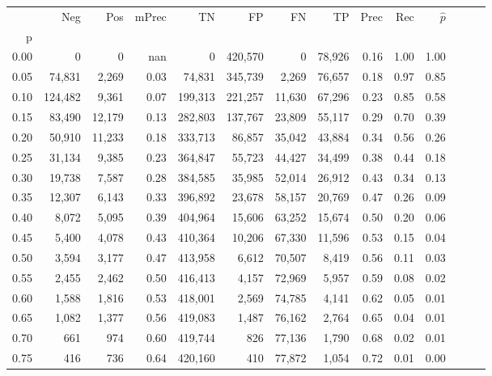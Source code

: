 \begin{tabular}{rrrrrrrrrrrrrr}
\toprule
{} &      Neg &     Pos & mPrec &       TN &       FP &      FN &      TP &  Prec &   Rec & $\hat{p}$ \\
p    &          &         &       &          &          &         &         &       &       &           \\
\midrule
0.00 &        0 &       0 &   nan &        0 &  420,570 &       0 &  78,926 &  0.16 &  1.00 &      1.00 \\
0.05 &   74,831 &   2,269 &  0.03 &   74,831 &  345,739 &   2,269 &  76,657 &  0.18 &  0.97 &      0.85 \\
0.10 &  124,482 &   9,361 &  0.07 &  199,313 &  221,257 &  11,630 &  67,296 &  0.23 &  0.85 &      0.58 \\
0.15 &   83,490 &  12,179 &  0.13 &  282,803 &  137,767 &  23,809 &  55,117 &  0.29 &  0.70 &      0.39 \\
0.20 &   50,910 &  11,233 &  0.18 &  333,713 &   86,857 &  35,042 &  43,884 &  0.34 &  0.56 &      0.26 \\
0.25 &   31,134 &   9,385 &  0.23 &  364,847 &   55,723 &  44,427 &  34,499 &  0.38 &  0.44 &      0.18 \\
0.30 &   19,738 &   7,587 &  0.28 &  384,585 &   35,985 &  52,014 &  26,912 &  0.43 &  0.34 &      0.13 \\
0.35 &   12,307 &   6,143 &  0.33 &  396,892 &   23,678 &  58,157 &  20,769 &  0.47 &  0.26 &      0.09 \\
0.40 &    8,072 &   5,095 &  0.39 &  404,964 &   15,606 &  63,252 &  15,674 &  0.50 &  0.20 &      0.06 \\
0.45 &    5,400 &   4,078 &  0.43 &  410,364 &   10,206 &  67,330 &  11,596 &  0.53 &  0.15 &      0.04 \\
0.50 &    3,594 &   3,177 &  0.47 &  413,958 &    6,612 &  70,507 &   8,419 &  0.56 &  0.11 &      0.03 \\
0.55 &    2,455 &   2,462 &  0.50 &  416,413 &    4,157 &  72,969 &   5,957 &  0.59 &  0.08 &      0.02 \\
0.60 &    1,588 &   1,816 &  0.53 &  418,001 &    2,569 &  74,785 &   4,141 &  0.62 &  0.05 &      0.01 \\
0.65 &    1,082 &   1,377 &  0.56 &  419,083 &    1,487 &  76,162 &   2,764 &  0.65 &  0.04 &      0.01 \\
0.70 &      661 &     974 &  0.60 &  419,744 &      826 &  77,136 &   1,790 &  0.68 &  0.02 &      0.01 \\
0.75 &      416 &     736 &  0.64 &  420,160 &      410 &  77,872 &   1,054 &  0.72 &  0.01 &      0.00 \\

\end{tabular}
